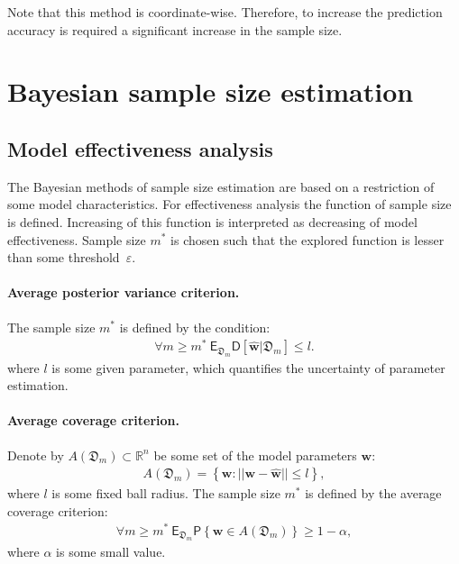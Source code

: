 \documentclass[
11pt,%
tightenlines,%
twoside,%
onecolumn,%
nofloats,%
nobibnotes,%
nofootinbib,%
superscriptaddress,%
noshowpacs,%
centertags]%
{revtex4}
\begin{document}
Note that this method is coordinate-wise. Therefore, to increase the prediction accuracy is required a significant increase in the sample size.
    
\section{Bayesian sample size estimation}
\subsection{Model effectiveness analysis}
The Bayesian methods of sample size estimation are based on a restriction of some model characteristics. For effectiveness analysis the function of sample size is defined. Increasing of this function is interpreted as decreasing of model effectiveness. Sample size $m^*$ is chosen such that the explored function is lesser than some threshold~$\varepsilon$.

\paragraph{Average posterior variance criterion.}
The sample size $m^*$ is defined by the condition:
\[
\label{eq:bs:1}
\begin{aligned}
	\forall m \geq m^*  ~ \mathsf{E}_{\mathfrak{D}_m}\mathsf{D}\left[\hat{\textbf{w}}|\mathfrak{D}_m\right] \leq l.
\end{aligned}
\]
where $l$ is some given parameter, which quantifies the uncertainty of parameter estimation.

\paragraph{Average coverage criterion.}
Denote by $A\left(\mathfrak{D}_{m}\right) \subset \mathbb{R}^n$ be some set of the model parameters $\textbf{w}$:
\[
\label{eq:bs:2}
\begin{aligned}
	A\left(\mathfrak{D}_{m}\right) = \left\{\textbf{w}:||\textbf{w} - \hat{\textbf{w}}||\leq l\right\},
\end{aligned}
\]
where $l$ is some fixed ball radius.
The sample size $m^*$ is defined by the average coverage criterion:
\[
\label{eq:bs:3}
\begin{aligned}
	\forall m \geq m^*  ~ \mathsf{E}_{\mathfrak{D}_m}\mathsf{P}\left\{\textbf{w} \in A\left(\mathfrak{D}_m\right)\right\} \geq 1-\alpha,
\end{aligned}
\]
where $\alpha$ is some small value.
	
\end{document}
